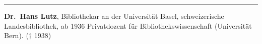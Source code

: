\begin{center}\rule{0.5\linewidth}{\linethickness}\end{center}

\textbf{Dr.~Hans Lutz}, Bibliothekar an der Universität Basel,
schweizerische Landesbibliothek, ab 1936 Privatdozent für
Bibliothekswissenschaft (Universität Bern). († 1938)
